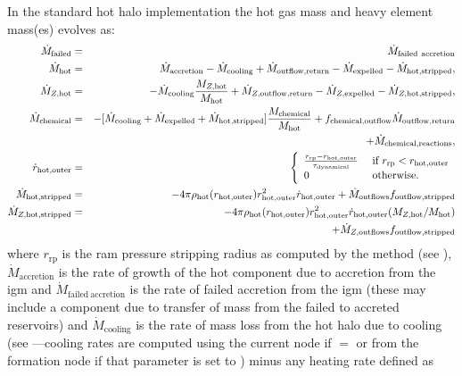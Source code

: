 In the standard hot halo implementation the hot gas mass and heavy element mass(es) evolves as:
\begin{eqnarray}
 \dot{M}_\mathrm{failed} &=& \dot{M}_\mathrm{failed~accretion} \\
 \dot{M}_\mathrm{hot} &=& \dot{M}_\mathrm{accretion} - \dot{M}_\mathrm{cooling} + \dot{M}_\mathrm{outflow,return} - \dot{M}_\mathrm{expelled} - \dot{M}_\mathrm{hot, stripped}, \\
 \dot{M}_{Z, \mathrm{hot}} &=& - \dot{M}_\mathrm{cooling} {M_{Z, \mathrm{hot}}\over M_\mathrm{hot}} + \dot{M}_{Z, \mathrm{outflow,return}} - \dot{M}_{Z,\mathrm{expelled}} - \dot{M}_{Z, \mathrm{hot, stripped}}, \\
 \dot{M}_\mathrm{chemical} &=& - [\dot{M}_\mathrm{cooling} + \dot{M}_\mathrm{expelled} + \dot{M}_\mathrm{hot, stripped}] {M_\mathrm{chemical}\over M_\mathrm{hot}} + f_\mathrm{chemical,outflow} \dot{M}_\mathrm{outflow,return} \nonumber \\ 
& & + \dot{M}_\mathrm{chemical,reactions}, \\
\dot{r}_\mathrm{hot, outer} &=& \left\{ \begin{array}{ll} {r_\mathrm{rp} - r_\mathrm{hot, outer} \over \tau_\mathrm{dynamical}} & \hbox{ if } r_\mathrm{rp} < r_\mathrm{hot, outer} \\ 0 & \hbox{ otherwise.} \end{array} \right. \\
\dot{M}_\mathrm{hot, stripped} &=& -4 \pi \rho_\mathrm{hot}(r_\mathrm{hot, outer}) r_\mathrm{hot, outer}^2 \dot{r}_\mathrm{hot, outer} + \dot{M}_\mathrm{outflows} f_\mathrm{outflow, stripped} \\
\dot{M}_{Z, \mathrm{hot, stripped}} &=& -4 \pi \rho_\mathrm{hot}(r_\mathrm{hot, outer}) r_\mathrm{hot, outer}^2 \dot{r}_\mathrm{hot, outer} (M_{Z, \mathrm{hot}} / M_\mathrm{hot}) \nonumber \\
 & & + \dot{M}_{Z, \mathrm{outflows}} f_\mathrm{outflow, stripped}  
\end{eqnarray}
where $r_\mathrm{rp}$ is the ram pressure stripping radius as computed by the  method (see ), $\dot{M}_\mathrm{accretion}$ is the rate of growth of the hot \gls{component} due to accretion from the \gls{igm} and $\dot{M}_\mathrm{failed~accretion}$ is the rate of failed accretion from the \gls{igm} (these may include a \gls{component} due to transfer of mass from the failed to accreted reservoirs) and $\dot{M}_\mathrm{cooling}$ is the rate of mass loss from the hot halo due to cooling (see ---cooling rates are computed using the current \gls{node} if \mono{[hotHaloCoolingFromNode]}$=$ or from the formation \gls{node} if that parameter is set to ) minus any heating rate defined as
